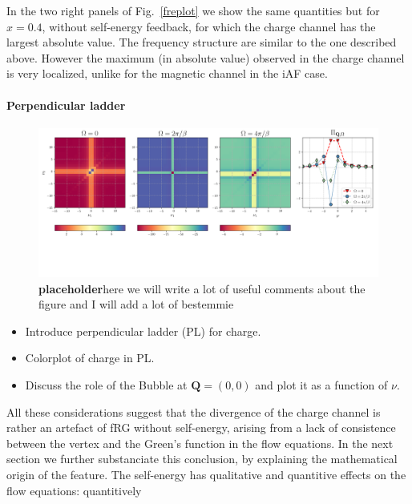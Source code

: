 In the two right panels of Fig.~\ref{freplot} we show the same quantities but for $x=0.4$, without self-energy feedback, for which the charge channel has the largest absolute value.  
The frequency structure are similar to the one described above. 
However the maximum (in absolute value) observed in the charge channel is very localized, unlike for the magnetic channel in the iAF case. 	

\paragraph*{Perpendicular ladder} 

 

 



\begin{figure}
\includegraphics[width=\textwidth]{images/PL_all.png}
\vspace*{-2.0cm}
\caption{\textbf{placeholder}here we will write a lot of useful comments about the figure and I will add a lot of bestemmie} 
\label{fig:perpladder}
\end{figure}


\begin{itemize}

\item Introduce perpendicular ladder (PL) for charge.

\item Colorplot of charge in PL.

\item Discuss the role of the Bubble at $\boldsymbol{Q}=(0,0)$ and plot it as a function of $\nu$.

\end{itemize}

All these considerations suggest that the divergence of the charge channel is rather an artefact of fRG without self-energy, arising from a lack of consistence between the vertex and the Green's function in the flow equations. 
In the next section we further substanciate this conclusion, by explaining the mathematical origin of the feature. 
The self-energy has qualitative and quantitive effects on the flow equations: quantitively 
